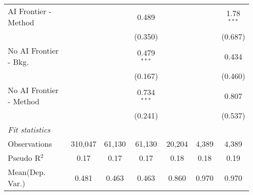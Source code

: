 \begin{tabular}{lcccccc}
   AI Frontier - Method    &               &               & 0.489         &              &             & 1.78$^{***}$\\   
                           &               &               & (0.350)       &              &             & (0.687)\\   
   No AI Frontier - Bkg.   &               &               & 0.479$^{***}$ &              &             & 0.434\\   
                           &               &               & (0.167)       &              &             & (0.460)\\   
   No AI Frontier - Method &               &               & 0.734$^{***}$ &              &             & 0.807\\   
                           &               &               & (0.241)       &              &             & (0.537)\\   
   \midrule
   \emph{Fit statistics}\\
   Observations            & 310,047       & 61,130        & 61,130        & 20,204       & 4,389       & 4,389\\  
   Pseudo R$^2$            & 0.17          & 0.17          & 0.17          & 0.18         & 0.18        & 0.19\\  
Mean(Dep. Var.) & 0.481 & 0.463 & 0.463 & 0.860 & 0.970 & 0.970 \\
   

\end{tabular}
